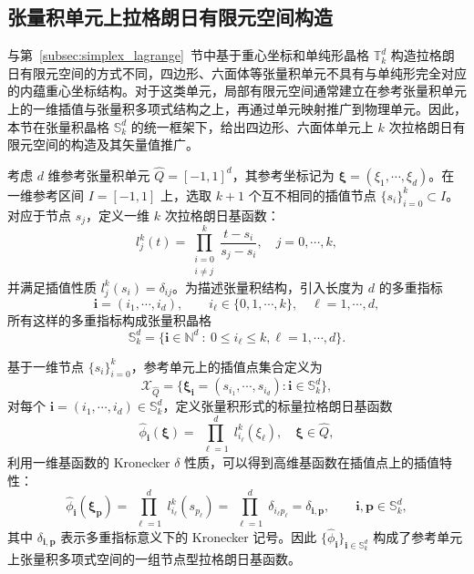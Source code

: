 

\subsection{张量积单元上拉格朗日有限元空间构造}
\label{subsec:tensor_lagrange}

与第~\ref{subsec:simplex_lagrange}~节中基于重心坐标和单纯形晶格 $\mathbb{T}_k^d$ 构造拉格朗日有限元空间的方式不同，四边形、六面体等张量积单元不具有与单纯形完全对应的内蕴重心坐标结构。对于这类单元，局部有限元空间通常建立在参考张量积单元上的一维插值与张量积多项式结构之上，再通过单元映射推广到物理单元。因此，本节在张量积晶格 $\mathbb{S}_k^d$ 的统一框架下，给出四边形、六面体单元上 $k$ 次拉格朗日有限元空间的构造及其矢量值推广。

考虑 $d$ 维参考张量积单元  $\hat{Q} = [-1,1]^d$，其参考坐标记为 $\boldsymbol{\xi} = (\xi_1,\cdots,\xi_d)$。在一维参考区间 $I = [-1,1]$ 上，选取 $k+1$ 个互不相同的插值节点 $\{s_i\}_{i=0}^k\subset{I}$。对应于节点 $s_j$，定义一维 $k$ 次拉格朗日基函数：
\[
l_j^k(t) = \prod_{\substack{i=0 \\ i\neq j}}^k \frac{t-s_i}{s_j-s_i}, \quad j=0,\cdots,k,
\]
并满足插值性质 $l_j^k(s_i) = \delta_{ij}$。为描述张量积结构，引入长度为 $d$ 的多重指标
\[
\boldsymbol{i} = (i_1,\cdots,i_d),\qquad{i}_{\ell}\in\{0,1,\cdots,k\},\quad\ell=1,\cdots,d,
\]
所有这样的多重指标构成张量积晶格
\[
\mathbb{S}_k^d = \{\boldsymbol{i}\in\mathbb{N}^d~:~0\leq{i}_\ell\leq{k},\ell=1,\cdots,d\}.
\]

基于一维节点 $\{s_i\}_{i=0}^k$，参考单元上的插值点集合定义为
\[
\mathcal{X}_{\hat{Q}} = \{\boldsymbol{\xi}_{\boldsymbol{i}} = (s_{i_1},\cdots,s_{i_d}):\boldsymbol{i}\in\mathbb{S}_k^d\},
\]
对每个 $\boldsymbol{i} = (i_1,\cdots,i_d)\in\mathbb{S}_k^d$，定义张量积形式的标量拉格朗日基函数
\[
\hat{\phi}_{\boldsymbol{i}}(\boldsymbol{\xi}) = \prod_{\substack{\ell=1}}^dl_{i_\ell}^k(\xi_\ell),\quad\boldsymbol{\xi}\in\hat{Q},
\]
利用一维基函数的 Kronecker $\delta$ 性质，可以得到高维基函数在插值点上的插值特性：
\[
\hat{\phi}_{\boldsymbol{i}}(\boldsymbol{\xi}_{\boldsymbol{p}}) = \prod_{\substack{\ell=1}}^dl_{i_\ell}^k(s_{p_\ell}) = \prod_{\substack{\ell=1}}^d\delta_{i_{\ell}p_{\ell}} = \delta_{\boldsymbol{i},\boldsymbol{p}},\qquad\boldsymbol{i},\boldsymbol{p}\in\mathbb{S}_k^d,
\]
其中 $\delta_{\boldsymbol{i},\boldsymbol{p}}$ 表示多重指标意义下的 Kronecker 记号。因此 $\{\hat{\phi}_{\boldsymbol{i}}\}_{\boldsymbol{i}\in\mathbb{S}_k^d}$ 构成了参考单元上张量积多项式空间的一组节点型拉格朗日基函数。

